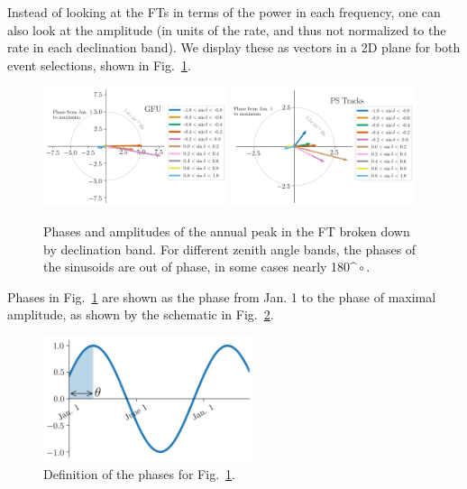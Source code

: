 Instead of looking at the FTs in terms of the power in each frequency, one can also look at the amplitude (in units of the rate, and thus not normalized to the rate in each declination band). We display these as vectors in a 2D plane for both event selections, shown in Fig.~\ref{fig:phasor}. 

\begin{figure}
    \centering
    \includegraphics[width=0.48\textwidth]{images/gfu_online_phasor.png}
    \includegraphics[width=0.48\textwidth]{images/ps_tracks_phasor.png}
    \caption{Phases and amplitudes of the annual peak in the FT broken down by declination band. For different zenith angle bands, the phases of the sinusoids are out of phase, in some cases nearly 180$\^{\circ}$. }
    \label{fig:phasor}
\end{figure}

Phases in Fig.~\ref{fig:phasor} are shown as the phase from Jan. 1 to the phase of maximal amplitude, as shown by the schematic in Fig.~\ref{fig:ft_schematic}. 

\begin{figure}
    \centering
    \includegraphics[width=0.55\textwidth]{images/phase_schematic.png}
    \caption{Definition of the phases for Fig.~\ref{fig:phasor}.}
    \label{fig:ft_schematic}
\end{figure}